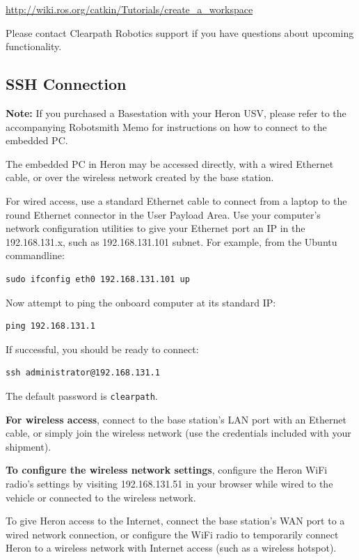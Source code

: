 \documentclass[]{clearpath-latex/clearpath-manual}
\begin{document}
\url{http://wiki.ros.org/catkin/Tutorials/create_a_workspace}

Please contact Clearpath Robotics support if you have questions about upcoming functionality.



\subsection{SSH Connection}

\textbf{Note:} If you purchased a Basestation with your Heron USV, please refer to the accompanying Robotsmith Memo for instructions on how to connect to the embedded PC.

The embedded PC in Heron may be accessed directly, with a wired Ethernet cable, or over the wireless network created by the base station.

For wired access, use a standard Ethernet cable to connect from a laptop to the round Ethernet connector in the User Payload Area. Use your computer’s network configuration utilities to give your Ethernet port an IP in the 192.168.131.x, such as 192.168.131.101 subnet. For example, from the Ubuntu commandline:

\begin{lstlisting}
sudo ifconfig eth0 192.168.131.101 up
\end{lstlisting}

Now attempt to ping the onboard computer at its standard IP:

\begin{lstlisting}
ping 192.168.131.1
\end{lstlisting}

If successful, you should be ready to connect:

\begin{lstlisting}
ssh administrator@192.168.131.1
\end{lstlisting}

The default password is \lstinline{clearpath}.


\textbf{For wireless access}, connect to the base station’s LAN port with an Ethernet cable, or simply join the wireless network (use the credentials included with your shipment).

\textbf{To configure the wireless network settings}, configure the Heron WiFi radio's settings by visiting 192.168.131.51 in your browser while wired to the vehicle or connected to the wireless network.


To give Heron access to the Internet, connect the base station’s WAN port to a wired network connection, or configure the WiFi radio to temporarily connect Heron to a wireless network with Internet access (such as a wireless hotspot).
\end{document}
